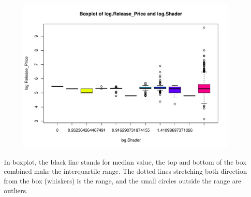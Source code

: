 \documentclass[a4paper]{article}
\begin{document}
\begin{figure}[H]
    \centering
    \includegraphics[keepaspectratio, width=1\textwidth, height=1\textheight]{Visualization/Boxplot/price_shader.pdf}
\end{figure}
In boxplot, the black line stands for median value, the top and bottom of the box combined make the interquartile range. The dotted lines stretching both direction from the box (whiskers) is the range, and the small circles outside the range are outliers.
\end{document}
